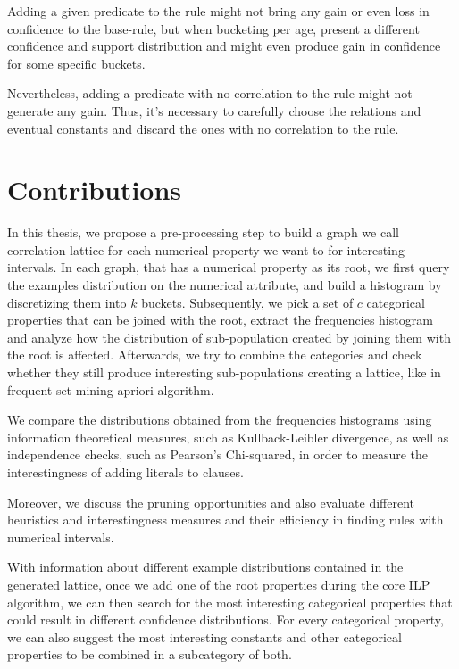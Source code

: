 Adding a given predicate to the rule might not bring any gain or even loss in confidence to the base-rule, but when
bucketing per age, present a different confidence and support distribution and might even produce gain in confidence for
some specific buckets.

Nevertheless, adding a predicate with no correlation to the rule might not generate any gain. Thus, it's necessary to
carefully choose the relations and eventual constants and discard the ones with no correlation to the rule.  

\section{Contributions}
In this thesis, we propose a pre-processing step to build a graph we call correlation lattice for each numerical
property we want to for interesting intervals. In each graph, that has a numerical property as its root, we first
query the examples distribution on the numerical attribute, and build a histogram by discretizing them into $k$
buckets. Subsequently, we  pick a set of $c$ categorical properties that can be joined with the root, extract the
frequencies histogram and analyze how the distribution of sub-population created by joining them with the root is
affected. Afterwards, we try to combine the categories and check whether they still produce interesting sub-populations
creating a lattice, like in frequent set mining apriori algorithm.

We compare the distributions obtained from the frequencies histograms using information theoretical measures,
such as Kullback-Leibler divergence, as well as independence checks, such as Pearson's Chi-squared, in order to
measure the interestingness of adding literals to clauses.

Moreover, we discuss the pruning opportunities and also evaluate different heuristics and interestingness measures and
their efficiency in finding rules with numerical intervals. 

\begin{comment}
In a clause containing a numerical attribute in the body, we can obtain a support and confidence as well as support
value for each of the buckets. Therewith, we can search the most interesting intervals that satisfies the support and
confidence thresholds
\end{comment}

With information about different example distributions contained in the generated lattice, once we add one of the root
properties during the core ILP algorithm, we can then search for the most interesting categorical properties that could
result in different confidence distributions. For every categorical property, we can also suggest the most interesting
constants and other categorical properties to be combined in a subcategory of both.

